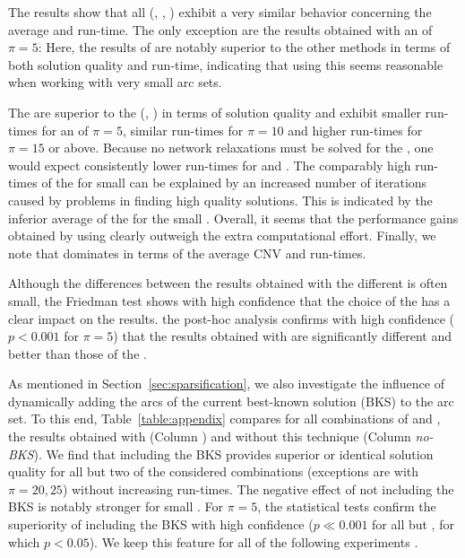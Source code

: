 \documentclass[11pt,a4paper,fleqn]{article}
\begin{document}
The results show that all \reducedcostbased \sms (\nrcs, \nrtacs, \nrtwotacs) exhibit a very similar behavior concerning the average \cnvs and run-time. The only exception are the results obtained with an \sfa of $\pi=5$: Here, the results of \nrtacs are notably superior to the other methods in terms of both solution quality and run-time, indicating that using this \sm seems reasonable when working with very small \reduced arc sets. 


The \reducedcostbased \sms are superior to the \standardSMS \sms (\costs, \tacs) in terms of solution quality and exhibit smaller run-times for an \sfa of $\pi=5$, similar run-times for $\pi=10$ and higher run-times for $\pi=15$ or above. Because no network relaxations must be solved for the \standardSMS \sms, one would expect consistently lower run-times for \costs and \tacs. The comparably high run-times of the \standardSMS \sms for small \sfas can be explained by an increased number of iterations caused by problems in finding high quality solutions. This is indicated by the inferior average \cnvs of the \standardSMS \sms for the small \sfas. Overall, it seems that the performance gains obtained by using \reducedcostbased \sms clearly outweigh the extra computational effort. Finally, we note that \tacs dominates \costs in terms of the average CNV and run-times. 

{Although the differences between the results obtained with the different \sms is often small, the Friedman test shows with high confidence that the choice of the \sm has a clear impact on the results.  the post-hoc analysis confirms with high confidence ($p < 0.001$ for $\pi=5$) that the results obtained with \reducedcostbased \sms are significantly different and better than those of the \standardSMS \sms.} 

As mentioned in Section~\ref{sec:sparsification}, we also investigate the influence of dynamically adding the arcs of the current best-known solution (BKS) to the \reduced arc set. To this end, Table~\ref{table:appendix} compares for all combinations of \sms and \sfas, the results obtained with (Column \emph{\baseC}) and without this technique (Column \emph{no-BKS}). We find that including the BKS provides superior or identical solution quality for all but two of the considered combinations (exceptions are \nrtwotacs with $\pi=20,25$) without increasing run-times. The negative effect of not including the BKS is notably stronger for small \sfas. {For $\pi=5$, the statistical tests confirm the superiority of including the BKS with high confidence ($p \ll 0.001$ for all \sms but \nrtwotacs, for which $p<0.05$).} We keep this feature for all of the following experiments .
\end{document}
